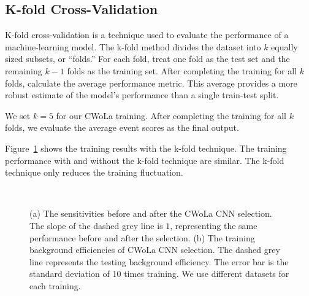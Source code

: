 \documentclass[12pt]{article}
\begin{document}
	\subsection{K-fold Cross-Validation}%
	\label{sub:k_fold_cross_validation}
		K-fold cross-validation is a technique used to evaluate the performance of a machine-learning model. The k-fold method divides the dataset into $k$ equally sized subsets, or ``folds.'' For each fold, treat one fold as the test set and the remaining $k - 1$ folds as the training set. After completing the training for all $k$ folds, calculate the average performance metric. This average provides a more robust estimate of the model's performance than a single train-test split.

		We set $k=5$ for our CWoLa training. After completing the training for all $k$ folds, we evaluate the average event scores as the final output.

		Figure~\ref{fig:sensitivity_improvement_background_pass_rate_k_fold} shows the training results with the k-fold technique. The training performance with and without the k-fold technique are similar. The k-fold technique only reduces the training fluctuation.
        \begin{figure}[htpb]
            \centering
             \\
            \caption{(a) The sensitivities before and after the CWoLa CNN selection. The slope of the dashed grey line is $1$, representing the same performance before and after the selection. (b) The training background efficiencies of CWoLa CNN selection. The dashed grey line represents the testing background efficiency. The error bar is the standard deviation of 10 times training. We use different datasets for each training.}
            \label{fig:sensitivity_improvement_background_pass_rate_k_fold}
        \end{figure}
\end{document}
